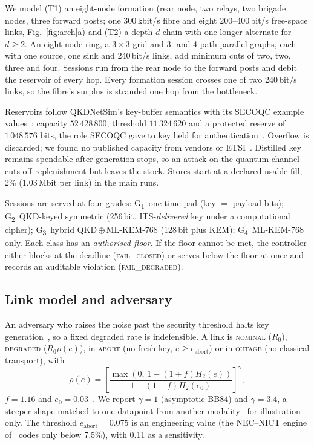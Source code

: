 \documentclass[conference,a4paper]{IEEEtran}
\newcommand{\GI}{G\textsubscript{1}}
\newcommand{\GII}{G\textsubscript{2}}
\newcommand{\GIII}{G\textsubscript{3}}
\newcommand{\GIV}{G\textsubscript{4}}
\begin{document}
We model (T1) an eight-node formation (rear node, two relays, two brigade nodes, three
forward posts; one 300\,kbit/s fibre and eight 200--400\,bit/s free-space links,
Fig.~\ref{fig:arch}a) and (T2) a depth-$d$ chain with one longer alternate for
$d\ge2$. An eight-node ring, a $3\times3$ grid and 3- and 4-path parallel graphs, each
with one source, one sink and 240\,bit/s links, add minimum cuts of two, two, three
and four. Sessions run from the rear node to the forward posts and debit the reservoir
of every hop. Every formation session crosses one of two 240\,bit/s links, so the
fibre's surplus is stranded one hop from the bottleneck.

Reservoirs follow QKDNetSim's key-buffer semantics with its SECOQC example
values~\cite{qkdnetsim}: capacity $52\,428\,800$, threshold $11\,324\,620$ and a
protected reserve of $1\,048\,576$ bits, the role SECOQC gave to key held for
authentication~\cite{peev}. Overflow is discarded; we found no published capacity from
vendors or ETSI~\cite{etsi014}. Distilled key remains spendable after generation
stops, so an attack on the quantum channel cuts off replenishment but leaves the
stock. Stores start at a declared usable fill, 2\% (1.03\,Mbit per link) in the main
runs.

Sessions are served at four grades: \GI\ one-time pad (key $=$ payload bits); \GII\
QKD-keyed symmetric (256\,bit, ITS-\emph{delivered} key under a computational cipher);
\GIII\ hybrid QKD\,$\oplus$\,ML-KEM-768 (128\,bit plus KEM); \GIV\ ML-KEM-768 only.
Each class has an \emph{authorised floor}. If the floor cannot be met, the controller
either blocks at the deadline (\textsc{fail\_closed}) or serves below the floor at once
and records an auditable violation (\textsc{fail\_degraded}).

\subsection{Link model and adversary}\label{sec:link}
An adversary who raises the noise past the security threshold halts key
generation~\cite{alleaume}, so a fixed degraded rate is indefensible. A link
is \textsc{nominal} ($R_0$), \textsc{degraded} ($R_0\rho(e)$), in \textsc{abort} (no
fresh key, $e\ge e_{\mathrm{abort}}$) or in \textsc{outage} (no classical transport),
with
\begin{equation}\label{eq:rho}
\rho(e)=\left[\frac{\max\!\left(0,\,1-(1+f)H_2(e)\right)}
{1-(1+f)H_2(e_0)}\right]^{\gamma},
\end{equation}
$f=1.16$ and $e_0=0.03$~\cite{sasaki}. We report $\gamma=1$ (asymptotic BB84) and
$\gamma=3.4$, a steeper shape matched to one datapoint from another
modality~\cite{sasaki} for illustration only. The threshold $e_{\mathrm{abort}}=0.075$ is an engineering value (the NEC--NICT engine of~\cite{sasaki} codes only below 7.5\%), with
0.11 as a sensitivity.
\end{document}
